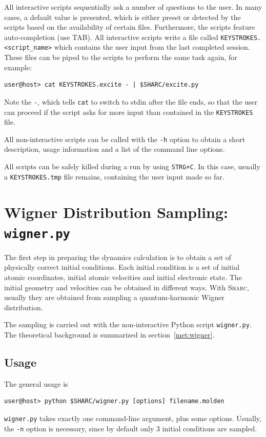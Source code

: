 \documentclass[a4paper,11pt,DIV=15,openany,twoside=false]{scrbook}
\newcommand{\sharc}{\textsc{Sharc}}
\newcommand{\ttt}[1]{\texttt{#1}}
\begin{document}
All interactive scripts sequentially ask a number of questions to the user. In many cases, a default value is presented, which is either preset or detected by the scripts based on the availability of certain files. Furthermore, the scripts feature auto-completion (use TAB). All interactive scripts write a file called \ttt{KEYSTROKES.<script\_name>} which contains the user input from the last completed session. These files can be piped to the scripts to perform the same task again, for example:
\begin{verbatim}
user@host> cat KEYSTROKES.excite - | $SHARC/excite.py
\end{verbatim}
Note the \ttt{-}, which tells \ttt{cat} to switch to stdin after the file ends, so that the user can proceed if the script asks for more input than contained in the \ttt{KEYSTROKES} file.

All non-interactive scripts can be called with the \ttt{-h} option to obtain a short description, usage information and a list of the command line options.

All scripts can be safely killed during a run by using \ttt{STRG+C}. In this case, usually a \ttt{KEYSTROKES.tmp} file remains, containing the user input made so far.

\section{Wigner Distribution Sampling: \ttt{wigner.py}}\label{sec:wigner.py}

The first step in preparing the dynamics calculation is to obtain a set of physically correct initial conditions. Each initial condition is a set of initial atomic coordinates, initial atomic velocities and initial electronic state. The initial geometry and velocities can be obtained in different ways. With \sharc, usually they are obtained from sampling a quantum-harmonic Wigner distribution. 

The sampling is carried out with the non-interactive Python script \ttt{wigner.py}. The theoretical background is summarized in section~\ref{met:wigner}.

\subsection{Usage}

The general usage is 
\begin{verbatim}
user@host> python $SHARC/wigner.py [options] filename.molden
\end{verbatim}
\ttt{wigner.py} takes exactly one command-line argument, plus some options. Usually, the \ttt{-n} option is necessary, since by default only 3 initial conditions are sampled.
\end{document}
